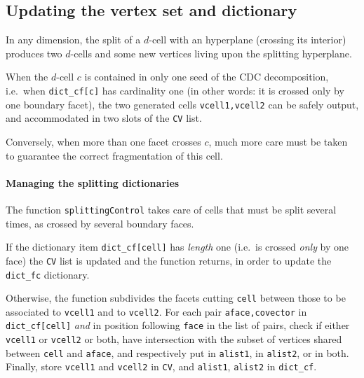 \documentclass[11pt,oneside]{article}	%
\begin{document}
\subsection{Updating the vertex set and dictionary}

In any dimension, the split of a $d$-cell with an hyperplane (crossing its interior) produces two $d$-cells and some new vertices living upon the splitting hyperplane.

When the $d$-cell $c$ is contained in only one seed of the CDC decomposition, i.e.~when \texttt{dict\_cf[c]} has cardinality one (in other words: it is crossed only by one boundary facet), the two generated cells \texttt{vcell1,vcell2} can be safely output, and accommodated in two slots of the \texttt{CV} list.

Conversely, when more than one facet crosses $c$, much more care must be taken to guarantee the correct fragmentation of this cell.


\paragraph{Managing the splitting dictionaries}
The function \texttt{splittingControl} takes care of cells that must be split several times, as crossed by several boundary faces. 

If the dictionary item \texttt{dict\_cf[cell]} has \emph{length} one (i.e.~is crossed  \emph{only} by one face) the \texttt{CV} list is updated and the function returns, in order to update the \texttt{dict\_fc} dictionary.

Otherwise, the function subdivides the facets cutting \texttt{cell} between those to be associated to \texttt{vcell1} and to \texttt{vcell2}. 
For each pair \texttt{aface,covector} in \texttt{dict\_cf[cell]} \emph{and} in position following \texttt{face} in the list of pairs, check if either \texttt{vcell1} or \texttt{vcell2} or both, have intersection with the subset of vertices shared between \texttt{cell} and \texttt{aface}, and respectively put in \texttt{alist1}, in \texttt{alist2}, or in both.
Finally, store \texttt{vcell1} and \texttt{vcell2} in \texttt{CV}, and \texttt{alist1}, \texttt{alist2} in \texttt{dict\_cf}.
\end{document}
